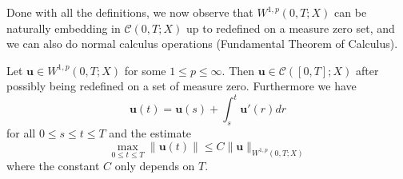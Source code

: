 \documentclass{article}
\begin{document}
Done with all the definitions, we now observe that $W^{1,p}(0,T; X)$ can be naturally embedding in $\mathscr{C}(0,T; X)$ up to redefined on a measure zero set, and we can also do normal calculus operations (Fundamental Theorem of Calculus). 

\begin{Th}
    Let $\textbf{u}\in W^{1, p}(0,T; X)$ for some $1\leq p\leq\infty$. Then $\textbf{u}\in\mathscr{C}([0, T]; X)$ after possibly being redefined on a set of measure zero. Furthermore we have 
    $$
    \textbf{u}(t)=\textbf{u}(s)+\int_s^t\textbf{u}'(r)dr
    $$ for all $0\leq s\leq t\leq T$ and the estimate 
    $$
    \max_{0\leq t\leq T}\|\textbf{u}(t)\|\leq C\|\textbf{u}\|_{W^{1, p}(0, T; X)}
    $$ where the constant $C$ only depends on $T$.
\end{Th}
\end{document}
